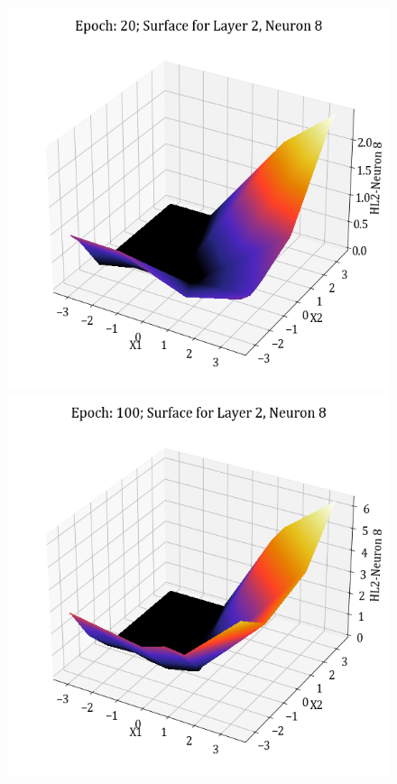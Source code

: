 \documentclass[11pt,a4paper]{article}
\begin{document}
\begin{figure}[H]
    \includegraphics[scale=0.4]{images/1B_MLFFNN_E20_HL2_N8.png}
    \includegraphics[scale=0.4]{images/1B_MLFFNN_E100_HL2_N8.png}

\end{figure}
\end{document}
